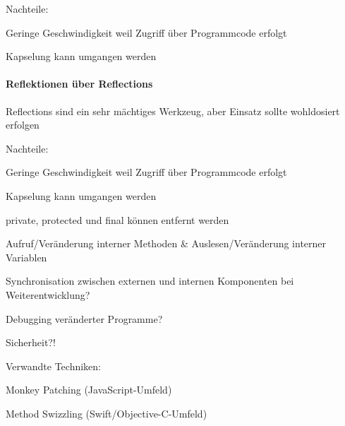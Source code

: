 \documentclass[10pt]{article}
\begin{document}
Nachteile:
\begin{itemize*}
  \item Geringe Geschwindigkeit weil Zugriff über Programmcode erfolgt
  \item Kapselung kann umgangen werden
\end{itemize*}



\paragraph{Reflektionen über Reflections}
\begin{itemize*}
  \item Reflections sind ein sehr mächtiges Werkzeug, aber Einsatz sollte wohldosiert erfolgen
  \item Nachteile:
  \begin{itemize*}
    \item Geringe Geschwindigkeit weil Zugriff über Programmcode erfolgt
    \item Kapselung kann umgangen werden
    \begin{itemize*}
      \item private, protected und final können entfernt werden
      \item Aufruf/Veränderung interner Methoden \& Auslesen/Veränderung interner Variablen
      \item Synchronisation zwischen externen und internen Komponenten bei Weiterentwicklung?
    \end{itemize*}
    \item Debugging veränderter Programme?
    \item Sicherheit?!
  \end{itemize*}
  \item Verwandte Techniken:
  \begin{itemize*}
    \item Monkey Patching (JavaScript-Umfeld)
    \item Method Swizzling (Swift/Objective-C-Umfeld)
  \end{itemize*}
\end{itemize*}
\end{document}
